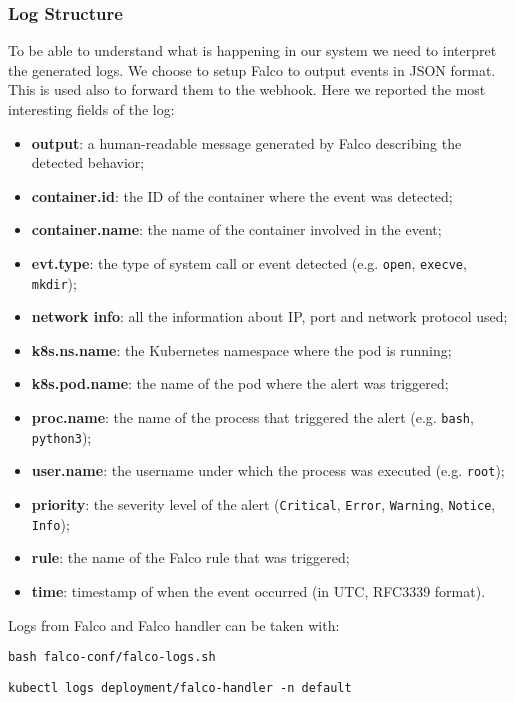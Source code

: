 \subsubsection{Log Structure}
To be able to understand what is happening in our system we need to interpret the generated logs. We choose to setup Falco to output events in JSON format. This is used also to forward them to the webhook. Here we reported the most interesting fields of the log:
\begin{itemize}
  \item \textbf{output}: a human-readable message generated by Falco describing the detected behavior;
  \item \textbf{container.id}: the ID of the container where the event was detected;
  \item \textbf{container.name}: the name of the container involved in the event;
  \item \textbf{evt.type}: the type of system call or event detected (e.g. \texttt{open}, \texttt{execve}, \texttt{mkdir});
  \item \textbf{network info}: all the information about IP, port and network protocol used;
  \item \textbf{k8s.ns.name}: the Kubernetes namespace where the pod is running;
  \item \textbf{k8s.pod.name}: the name of the pod where the alert was triggered;
  \item \textbf{proc.name}: the name of the process that triggered the alert (e.g. \texttt{bash}, \texttt{python3});
  \item \textbf{user.name}: the username under which the process was executed (e.g. \texttt{root});
  \item \textbf{priority}: the severity level of the alert (\texttt{Critical}, \texttt{Error}, \texttt{Warning}, \texttt{Notice}, \texttt{Info});
  \item \textbf{rule}: the name of the Falco rule that was triggered;
  \item \textbf{time}: timestamp of when the event occurred (in UTC, RFC3339 format).
\end{itemize}
Logs from Falco and Falco handler can be taken with:

\texttt{bash falco-conf/falco-logs.sh}

\texttt{kubectl logs deployment/falco-handler -n default}

